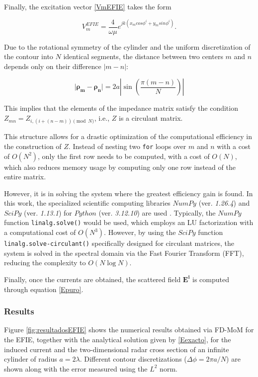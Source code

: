 \documentclass[11pt,a4paper,twoside,pdf]{article}
\numberwithin{equation}{section}
\begin{document}
Finally, the excitation vector \ref{VmEFIE} takes the form

$$
    V^{EFIE}_m = \frac{4}{\omega \mu} e^{jk (x_m cos\phi^i + y_m sin\phi^i)}.
$$



Due to the rotational symmetry of the cylinder and the uniform discretization of the contour into $N$ identical segments, the distance between two centers $m$ and $n$ depends only on their difference $|m-n|$:

$$\lvert \boldsymbol{\rho_m} - \boldsymbol{\rho_n} \rvert = 2a \left| \sin\left( \frac{\pi(m-n)}{N} \right) \right|$$

This implies that the elements of the impedance matrix satisfy the condition $Z_{mn} = Z_{i, (i+(n-m)) \pmod N}$, i.e., $Z$ is a circulant matrix.\newline

This structure allows for a drastic optimization of the computational efficiency in the construction of $Z$. Instead of nesting two \texttt{for} loops over $m$ and $n$ with a cost of $O(N^2)$, only the first row needs to be computed, with a cost of $O(N)$, which also reduces memory usage by computing only one row instead of the entire matrix.

However, it is in solving the system where the greatest efficiency gain is found. In this work, the specialized scientific computing libraries $NumPy$ (ver. \textit{1.26.4}) and $SciPy$ (ver. \textit{1.13.1}) for $Python$ (ver. \textit{3.12.10}) are used \cite{harris2020array, 2020SciPy-NMeth}. Typically, the $NumPy$ function \texttt{linalg.solve()} would be used, which employs an LU factorization with a computational cost of $O(N^3)$. However, by using the $SciPy$ function \texttt{linalg.solve-circulant()} specifically designed for circulant matrices, the system is solved in the spectral domain via the Fast Fourier Transform (FFT), reducing the complexity to $O(N \log N)$.

Finally, once the currents are obtained, the scattered field $\boldsymbol{E^i}$ is computed through equation \ref{Epuro}.\\


\subsubsection{Results}



Figure \ref{fig:resultadosEFIE} shows the numerical results obtained via FD-MoM for the EFIE, together with the analytical solution given by \ref{Eexacto}, for the induced current and the two-dimensional radar cross section of an infinite cylinder of radius $a = 2\lambda$. Different contour discretizations ($\Delta \phi = 2\pi a/ N$) are shown along with the error measured using the $L^2$ norm.
\end{document}

